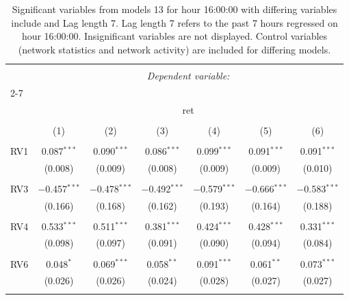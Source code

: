 
\begin{table}[!htbp] \centering 
  \caption{Significant variables from models 13 for hour 16:00:00 with differing variables include 
                               and Lag length 7. Lag length 7 refers to the past 7 hours regressed on hour 16:00:00. 
                               Insignificant variables are not displayed. 
                               Control variables (network statistics and network activity) are 
                               included for differing models.} 
  \label{RVmodels1_t_hourlagged3} 
\scriptsize 
\begin{tabular}{@{\extracolsep{5pt}}lcccccc} 
\\[-1.8ex]\hline 
\hline \\[-1.8ex] 
 & \multicolumn{6}{c}{\textit{Dependent variable:}} \\ 
\cline{2-7} 
\\[-1.8ex] & \multicolumn{6}{c}{ret} \\ 
\\[-1.8ex] & (1) & (2) & (3) & (4) & (5) & (6)\\ 
\hline \\[-1.8ex] 
 RV1 & 0.087$^{***}$ & 0.090$^{***}$ & 0.086$^{***}$ & 0.099$^{***}$ & 0.091$^{***}$ & 0.091$^{***}$ \\ 
  & (0.008) & (0.009) & (0.008) & (0.009) & (0.009) & (0.010) \\ 
  & & & & & & \\ 
 RV3 & $-$0.457$^{***}$ & $-$0.478$^{***}$ & $-$0.492$^{***}$ & $-$0.579$^{***}$ & $-$0.666$^{***}$ & $-$0.583$^{***}$ \\ 
  & (0.166) & (0.168) & (0.162) & (0.193) & (0.164) & (0.188) \\ 
  & & & & & & \\ 
 RV4 & 0.533$^{***}$ & 0.511$^{***}$ & 0.381$^{***}$ & 0.424$^{***}$ & 0.428$^{***}$ & 0.331$^{***}$ \\ 
  & (0.098) & (0.097) & (0.091) & (0.090) & (0.094) & (0.084) \\ 
  & & & & & & \\ 
 RV6 & 0.048$^{*}$ & 0.069$^{***}$ & 0.058$^{**}$ & 0.091$^{***}$ & 0.061$^{**}$ & 0.073$^{***}$ \\ 
  & (0.026) & (0.026) & (0.024) & (0.028) & (0.027) & (0.027) \\ 
  & & & & & & \\ 

\end{tabular}
\end{table}
